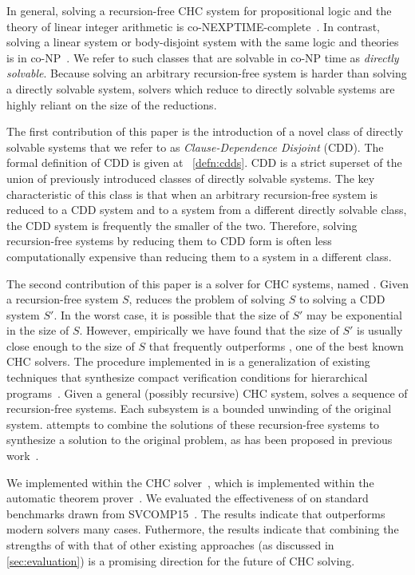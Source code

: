 In general, solving a recursion-free CHC system for
propositional logic and the theory of linear integer arithmetic is
co-NEXPTIME-complete~\cite{rummer13b}.
%
In contrast, solving a linear system or body-disjoint system with the
same logic and theories is in co-NP~\cite{rummer13b}.
%
We refer to such classes that are solvable in co-NP time as
\emph{directly solvable}.
%
Because solving an arbitrary recursion-free system is harder than
solving a directly solvable system, solvers which reduce to directly
solvable systems are highly reliant on the size of the reductions.

The first contribution of this paper is the introduction of a novel
class of directly solvable systems that we refer to as
\emph{Clause-Dependence Disjoint} (CDD).
%
The formal definition of CDD is given at ~\autoref{defn:cdds}.
%
CDD is a strict superset of the union of previously introduced classes
of directly solvable systems.
%
The key characteristic of this class is that when an arbitrary
recursion-free system is reduced to a CDD system and to a system from
a different directly solvable class, the CDD system is frequently the
smaller of the two.
%
Therefore, solving recursion-free systems by reducing them to CDD form
is often less computationally expensive than reducing them to a
system in a different class.

The second contribution of this paper is a solver for CHC systems,
named \sys.
%
Given a recursion-free system $S$, \sys reduces the problem of solving
$S$ to solving a CDD system $S'$.
%
In the worst case, it is possible that the size of $S'$ may be
exponential in the size of $S$.
%
However, empirically we have found that the size of $S'$ is usually
close enough to the size of $S$ that \sys frequently outperforms
\duality, one of the best known CHC solvers.
%
The procedure implemented in \sys is a generalization of existing
techniques that synthesize compact verification conditions for
hierarchical programs~\cite{flanagan01,lal-qadeer15}.
%
Given a general (possibly recursive) CHC system, \sys solves a
sequence of recursion-free systems.
%
Each subsystem is a bounded unwinding of the original system. \sys
attempts to combine the solutions of these recursion-free systems to
synthesize a solution to the original problem, as has been proposed
in previous work~\cite{rummer13b}.

We implemented \sys within the \duality CHC solver~\cite{bjorner13},
which is implemented within the \zthree automatic theorem
prover~\cite{moura08}.
%
We evaluated the effectiveness of \sys on standard benchmarks drawn
from SVCOMP15~\cite{svcomp15}.
%
The results indicate that \sys outperforms modern solvers many cases.
%
Futhermore, the results indicate that combining the strengths of \sys
with that of other existing approaches (as discussed in
\autoref{sec:evaluation}) is a promising direction for the future of
CHC solving.

